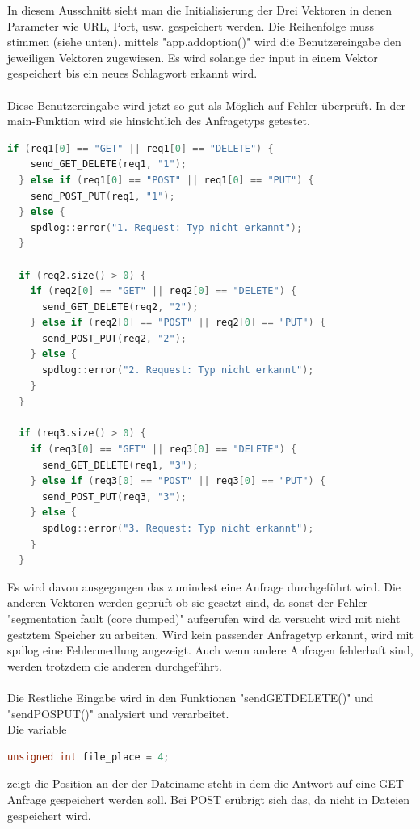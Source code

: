 \documentclass{article}
\begin{document}
In diesem Ausschnitt sieht man die Initialisierung der Drei Vektoren in denen Parameter wie URL, Port, usw. gespeichert werden. Die Reihenfolge muss stimmen (siehe unten). mittels "app.add\textunderscore option()" wird die Benutzereingabe den jeweiligen Vektoren zugewiesen. Es wird solange der input in einem Vektor gespeichert bis ein neues Schlagwort erkannt wird.
\\
\\
Diese Benutzereingabe wird jetzt so gut als Möglich auf Fehler überprüft. In der main-Funktion wird sie hinsichtlich des Anfragetyps getestet.
\begin{lstlisting}[language=C++]
if (req1[0] == "GET" || req1[0] == "DELETE") {
    send_GET_DELETE(req1, "1");
  } else if (req1[0] == "POST" || req1[0] == "PUT") {
    send_POST_PUT(req1, "1");
  } else {
    spdlog::error("1. Request: Typ nicht erkannt");
  }

  if (req2.size() > 0) {
    if (req2[0] == "GET" || req2[0] == "DELETE") {
      send_GET_DELETE(req2, "2");
    } else if (req2[0] == "POST" || req2[0] == "PUT") {
      send_POST_PUT(req2, "2");
    } else {
      spdlog::error("2. Request: Typ nicht erkannt");
    }
  }

  if (req3.size() > 0) {
    if (req3[0] == "GET" || req3[0] == "DELETE") {
      send_GET_DELETE(req1, "3");
    } else if (req3[0] == "POST" || req3[0] == "PUT") {
      send_POST_PUT(req3, "3");
    } else {
      spdlog::error("3. Request: Typ nicht erkannt");
    }
  }
\end{lstlisting}
Es wird davon ausgegangen das zumindest eine Anfrage durchgeführt wird. Die anderen Vektoren werden geprüft ob sie gesetzt sind, da sonst der Fehler "segmentation fault (core dumped)" aufgerufen wird da versucht wird mit nicht gestztem Speicher zu arbeiten. Wird kein passender Anfragetyp erkannt, wird mit spdlog eine Fehlermedlung angezeigt. Auch wenn andere Anfragen fehlerhaft sind, werden trotzdem die anderen durchgeführt.
\\
\\
Die Restliche Eingabe wird in den Funktionen "send\textunderscore GET\textunderscore DELETE()" und "send\textunderscore POS\textunderscore PUT()" analysiert und verarbeitet.\\
Die variable
\begin{lstlisting}[language=C++]
unsigned int file_place = 4;
\end{lstlisting}
zeigt die Position an der der Dateiname steht in dem die Antwort auf eine GET Anfrage gespeichert werden soll. Bei POST erübrigt sich das, da nicht in Dateien gespeichert wird.
\end{document}
